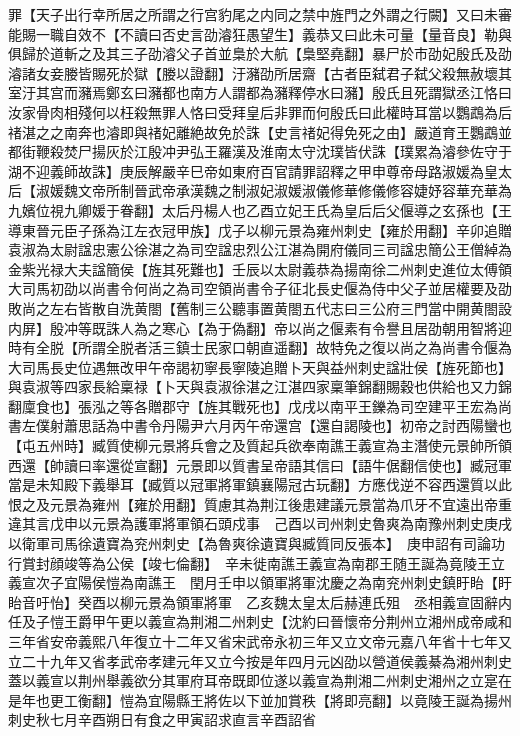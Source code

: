 罪【天子出行幸所居之所謂之行宫豹尾之内同之禁中旌門之外謂之行闕】又曰未審能賜一職自效不【不讀曰否史言劭濬狂愚望生】義恭又曰此未可量【量音良】勒與俱歸於道斬之及其三子劭濬父子首並梟於大航【梟堅堯翻】暴尸於市劭妃殷氏及劭濬諸女妾媵皆賜死於獄【媵以證翻】汙瀦劭所居齋【古者臣弑君子弑父殺無赦壞其室汙其宫而瀦焉鄭玄曰瀦都也南方人謂都為瀦釋停水曰瀦】殷氏且死謂獄丞江恪曰汝家骨肉相殘何以枉殺無罪人恪曰受拜皇后非罪而何殷氏曰此權時耳當以鸚鵡為后禇湛之之南奔也濬即與禇妃離絶故免於誅【史言禇妃得免死之由】嚴道育王鸚鵡並都街鞭殺焚尸揚灰於江殷冲尹弘王羅漢及淮南太守沈璞皆伏誅【璞累為濬參佐守于湖不迎義師故誅】庚辰解嚴辛巳帝如東府百官請罪詔釋之甲申尊帝母路淑媛為皇太后【淑媛魏文帝所制晉武帝承漢魏之制淑妃淑媛淑儀修華修儀修容婕妤容華充華為九嬪位視九卿媛于眷翻】太后丹楊人也乙酉立妃王氏為皇后后父偃導之玄孫也【王導東晉元臣子孫為江左衣冠甲族】戊子以柳元景為雍州刺史【雍於用翻】辛卯追贈袁淑為太尉諡忠憲公徐湛之為司空諡忠烈公江湛為開府儀同三司諡忠簡公王僧綽為金紫光禄大夫諡簡侯【旌其死難也】壬辰以太尉義恭為揚南徐二州刺史進位太傅領大司馬初劭以尚書令何尚之為司空領尚書令子征北長史偃為侍中父子並居權要及劭敗尚之左右皆散自洗黄閤【舊制三公聽事置黄閤五代志曰三公府三門當中開黄閤設内屏】殷冲等既誅人為之寒心【為于偽翻】帝以尚之偃素有令譽且居劭朝用智將迎時有全脱【所謂全脱者活三鎮士民家口朝直遥翻】故特免之復以尚之為尚書令偃為大司馬長史位遇無改甲午帝謁初寧長寧陵追贈卜天與益州刺史諡壯侯【旌死節也】與袁淑等四家長給稟禄【卜天與袁淑徐湛之江湛四家稟筆錦翻賜穀也供給也又力錦翻廩食也】張泓之等各贈郡守【旌其戰死也】戊戌以南平王鑠為司空建平王宏為尚書左僕射蕭思話為中書令丹陽尹六月丙午帝還宫【還自謁陵也】初帝之討西陽蠻也【屯五州時】臧質使柳元景將兵會之及質起兵欲奉南譙王義宣為主潛使元景帥所領西還【帥讀曰率還從宣翻】元景即以質書呈帝語其信曰【語牛倨翻信使也】臧冠軍當是未知殿下義舉耳【臧質以冠軍將軍鎮襄陽冠古玩翻】方應伐逆不容西還質以此恨之及元景為雍州【雍於用翻】質慮其為荆江後患建議元景當為爪牙不宜遠出帝重違其言戊申以元景為護軍將軍領石頭戍事　己酉以司州刺史魯爽為南豫州刺史庚戌以衛軍司馬徐遺寶為兖州刺史【為魯爽徐遺寶與臧質同反張本】　庚申詔有司論功行賞封顔竣等為公侯【竣七倫翻】　辛未徙南譙王義宣為南郡王随王誕為竟陵王立義宣次子宜陽侯愷為南譙王　閏月壬申以領軍將軍沈慶之為南兖州刺史鎮盱眙【盱眙音吁怡】癸酉以柳元景為領軍將軍　乙亥魏太皇太后赫連氏殂　丞相義宣固辭内任及子愷王爵甲午更以義宣為荆湘二州刺史【沈約曰晉懷帝分荆州立湘州成帝咸和三年省安帝義熙八年復立十二年又省宋武帝永初三年又立文帝元嘉八年省十七年又立二十九年又省孝武帝孝建元年又立今按是年四月元凶劭以營道侯義綦為湘州刺史蓋以義宣以荆州舉義欲分其軍府耳帝既即位遂以義宣為荆湘二州刺史湘州之立寔在是年也更工衡翻】愷為宜陽縣王將佐以下並加賞秩【將即亮翻】以竟陵王誕為揚州刺史秋七月辛酉朔日有食之甲寅詔求直言辛酉詔省

